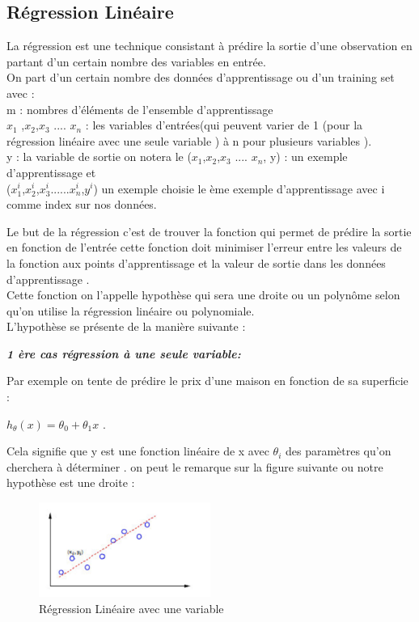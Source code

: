  \subsection{Régression Linéaire }
La régression est une technique consistant à prédire la sortie  d'une    observation en partant d'un certain nombre des variables  en entrée.\\
On part d'un certain nombre des données  d'apprentissage ou  d'un training set 
avec : \\
m :  nombres d'éléments de l'ensemble d'apprentissage \\
${x}_{1}$ ,${x}_{2}$,${x}_{3}$ .... ${x}_{n}$ : les variables d'entrées(qui peuvent varier de 1 (pour la régression linéaire avec une seule variable ) à n pour plusieurs variables  ).\\
y : la variable  de sortie 
on notera le (${x}_{1}$,${x}_{2}$,${x}_{3}$ .... ${x}_{n}$, y) : un exemple d'apprentissage
et\\
(${x}_{1}^{i}$,${x}_{2}^{i}$,${x}_{3}^{i}$......${x}_{n}^{i}$,${y}^{i}$)  un exemple choisie le ème exemple d'apprentissage avec  i comme index sur nos données.

Le but  de la régression c'est de trouver la fonction qui permet de prédire la sortie en fonction de l'entrée cette fonction doit  minimiser l'erreur entre les valeurs de la fonction aux points d'apprentissage et la valeur de sortie dans les données d'apprentissage .\\
Cette fonction on l'appelle hypothèse qui sera une droite ou un polynôme selon qu'on utilise la régression linéaire ou polynomiale. \\
L'hypothèse se présente de la manière suivante :

\textbf{\emph{1 ère cas régression à une seule variable: }} 

Par exemple on tente de prédire le prix d'une maison en fonction de sa superficie : 

${h}_{\theta}\left(x\right)={\theta }_{0}+{\theta }_{1}x$ .

Cela signifie que  y est une fonction linéaire de x avec ${\theta }_{i}$ des paramètres qu'on cherchera à déterminer .
on peut le remarque sur la figure suivante ou notre hypothèse est une droite :
\begin{figure}[ht]
	\centering
	\includegraphics[width=0.5\textwidth]{fig/regressionLineaire1var.png}
	\caption{Régression Linéaire avec une variable}
	\label{fig:image1}
\end{figure}

